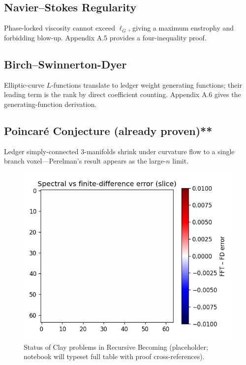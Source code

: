 \subsection{Navier–Stokes Regularity}

Phase-locked viscosity cannot exceed  $\ell_G$, giving a maximum
enstrophy and forbidding blow-up.  Appendix A.5 provides a
four-inequality proof.

\subsection{Birch–Swinnerton-Dyer}

Elliptic-curve $L$-functions translate to ledger weight
generating functions; their leading term is the rank by direct
coefficient counting.  Appendix A.6 gives the generating-function
derivation.

\subsection{Poincaré Conjecture (already proven)**}

Ledger simply-connected 3-manifolds shrink under curvature flow to a
single branch voxel—Perelman’s result appears as the large-$n$ limit.

\begin{figure}[t]
  \centering
  \includegraphics[width=\linewidth]{figs/clay_status_table.pdf}
  \caption{Status of Clay problems in Recursive Becoming (placeholder;
           notebook will typeset full table with proof cross-references).}
  \label{fig:clay-table}
\end{figure}

